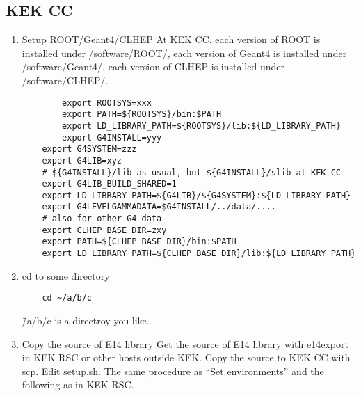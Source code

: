 \documentclass[a4paper,12pt]{article}
\begin{document}
  \subsection{KEK CC}
  \begin{enumerate}
   \item Setup ROOT/Geant4/CLHEP
	 At KEK CC, each version of ROOT is installed under
	 /software/ROOT/,
	 each version of Geant4 is installed under /software/Geant4/,
	 each version of CLHEP is installed under /software/CLHEP/.
	 \begin{verbatim}
        export ROOTSYS=xxx
        export PATH=${ROOTSYS}/bin:$PATH
        export LD_LIBRARY_PATH=${ROOTSYS}/lib:${LD_LIBRARY_PATH}
        export G4INSTALL=yyy
	export G4SYSTEM=zzz
	export G4LIB=xyz 
	# ${G4INSTALL}/lib as usual, but ${G4INSTALL}/slib at KEK CC
	export G4LIB_BUILD_SHARED=1
	export LD_LIBRARY_PATH=${G4LIB}/${G4SYSTEM}:${LD_LIBRARY_PATH}
	export G4LEVELGAMMADATA=$G4INSTALL/../data/....
	# also for other G4 data
	export CLHEP_BASE_DIR=zxy
	export PATH=${CLHEP_BASE_DIR}/bin:$PATH
	export LD_LIBRARY_PATH=${CLHEP_BASE_DIR}/lib:${LD_LIBRARY_PATH}
	 \end{verbatim}
   \item cd to some directory
	 \begin{verbatim}
	cd ~/a/b/c	
	 \end{verbatim}
	 \~/a/b/c is a directroy you like.
   \item Copy the source of E14 library
	 Get the source of E14 library with e14export in KEK RSC or other
	 hosts outside KEK.
	 Copy the source to KEK CC with scp.
	 Edit setup.sh. 
	 The same procedure as ``Set environments'' and the following as in
	 KEK RSC. 
  \end{enumerate}
\end{document}
